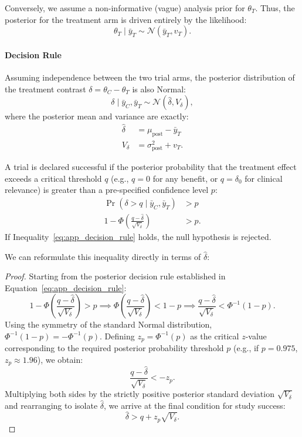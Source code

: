 Conversely, we assume a non-informative (vague) analysis prior for $\theta_T$. Thus, the posterior for the treatment arm is driven entirely by the likelihood:
$$
    \theta_T \mid \bar{y}_T \sim \mathcal{N}(\bar{y}_T, v_T).
$$

\paragraph{Decision Rule}
Assuming independence between the two trial arms, the posterior distribution of the treatment contrast $\delta = \theta_C - \theta_T$ is also Normal:
$$
    \delta \mid \bar{y}_C, \bar{y}_T \sim \mathcal{N}(\hat{\delta}, V_{\delta}),
$$
where the posterior mean and variance are exactly:
\begin{align*}
    \hat{\delta} &= \mu_{\text{post}} - \bar{y}_T \\
    V_{\delta} &= \sigma_{\text{post}}^2 + v_T.
\end{align*}

A trial is declared successful if the posterior probability that the treatment effect exceeds a critical threshold $q$ (e.g., $q=0$ for any benefit, or $q=\delta_0$ for clinical relevance) is greater than a pre-specified confidence level $p$:
\begin{align}
    \Pr(\delta > q \mid \bar{y}_C, \bar{y}_T) &> p \nonumber \\
    1 - \Phi\left( \frac{q - \hat{\delta}}{\sqrt{V_{\delta}}} \right) &> p. \label{eq:app_decision_rule}
\end{align}
If Inequality~\eqref{eq:app_decision_rule} holds, the null hypothesis is rejected.

We can reformulate this inequality directly in terms of $\hat{\delta}$:
\begin{proof}
Starting from the posterior decision rule established in Equation~\eqref{eq:app_decision_rule}:
$$
    1 - \Phi\left( \frac{q - \hat{\delta}}{\sqrt{V_{\delta}}} \right) > p \implies \Phi\left( \frac{q - \hat{\delta}}{\sqrt{V_{\delta}}} \right) < 1 - p \implies \frac{q - \hat{\delta}}{\sqrt{V_{\delta}}} < \Phi^{-1}(1 - p).
$$
Using the symmetry of the standard Normal distribution, $\Phi^{-1}(1 - p) = - \Phi^{-1}(p)$. Defining $z_p = \Phi^{-1}(p)$ as the critical $z$-value corresponding to the required posterior probability threshold $p$ (e.g., if $p = 0.975$, $z_p \approx 1.96$), we obtain:
$$
    \frac{q - \hat{\delta}}{\sqrt{V_{\delta}}} < -z_p.
$$
Multiplying both sides by the strictly positive posterior standard deviation $\sqrt{V_{\delta}}$ and rearranging to isolate $\hat{\delta}$, we arrive at the final condition for study success:
\begin{equation} \label{eq:app_success_condition_delta}
    \hat{\delta} > q + z_p \sqrt{V_{\delta}}.
\end{equation}
\end{proof}

